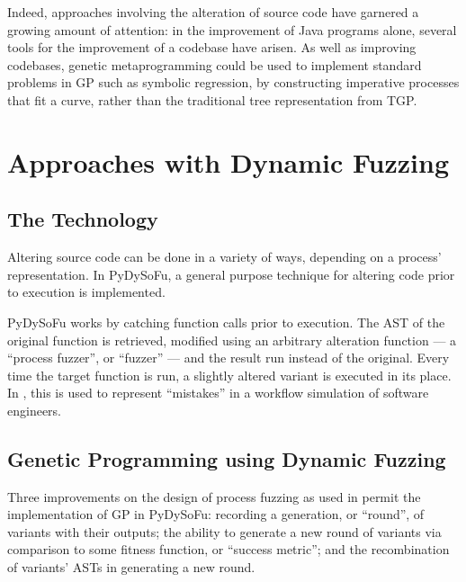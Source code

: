 \documentclass[draft,12pt]{llncs}   %
\begin{document}
Indeed, approaches involving the alteration of source code have garnered a
growing amount of attention: in the improvement of Java programs alone, several
tools for the improvement of a codebase have
arisen\cite{cody2015locogp,arcuri2008multi,castle2012evolving}. As well as
improving codebases, genetic metaprogramming could be used to implement standard
problems in GP such as symbolic regression, by constructing imperative processes
that fit a curve, rather than the traditional tree representation from
TGP\cite{koza1994genetic}.
\par


\section{Approaches with Dynamic Fuzzing}
\label{sec:dynamic_fuzzing}
\subsection{The Technology}
Altering source code can be done in a variety of ways, depending on a process'
representation. In PyDySoFu\cite{pydysofu}, a general purpose technique for altering
code prior to execution is implemented.\par

PyDySoFu works by catching function calls prior to execution. The AST of the
original function is retrieved, modified using an arbitrary alteration function
--- a ``process fuzzer'', or ``fuzzer'' --- and the result run instead of the
original. Every time the target function is run, a slightly altered
variant is executed in its place. In \cite{wallis2018a}, this is used to represent
``mistakes'' in a workflow simulation of software engineers.\par

\subsection{Genetic Programming using Dynamic Fuzzing}
Three improvements on the design of process fuzzing as used in
\cite{wallis2018a} permit the implementation of GP in PyDySoFu: recording a
generation, or ``round'', of variants with their outputs; the ability to
generate a new round of variants via comparison to some fitness function, or
``success metric''; and the recombination of variants' ASTs in generating a new
round.\par
\end{document}
